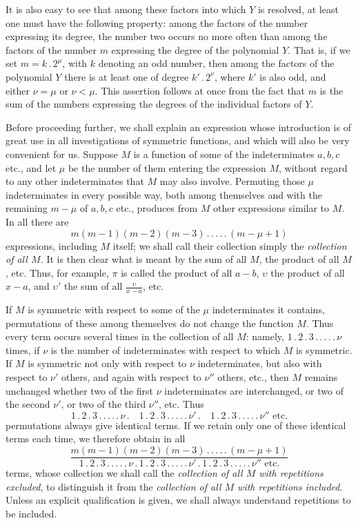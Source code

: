 It is also easy to see that among these factors into which $Y$ is resolved, at
least one must have the following property: among the factors of the number expressing its degree, the number two occurs no more often than among the factors of the number $m$ expressing the degree of the polynomial $Y$. That is, if we set $m=k\, .\,2^\mu$, with $k$ denoting an odd number, then among the factors of the polynomial $Y$ there is at least one of degree $k'\, .\,2^\nu$, where $k'$ is also odd, and either $\nu=\mu$ or $\nu<\mu$. This assertion follows at once from the fact that $m$ is the sum of the numbers expressing the degrees of the individual factors of $Y$.

Before proceeding further, we shall explain an expression whose introduction is of great use in all investigations of symmetric functions, and which will also be very convenient for us. Suppose $M$ is a function of some of the indeterminates $a,b,c$ etc., and let $\mu$ be the number of them entering the expression $M$, without regard to any other indeterminates that $M$ may also involve. Permuting those $\mu$ indeterminates in every possible way, both among themselves and with the remaining $m-\mu$ of $a,b,c$ etc., produces from $M$ other expressions similar to $M$. In all there are
\[
m(m-1)(m-2)(m-3)\, .\, .\, .\, .\, .\,(m-\mu+1)
\]
expressions, including $M$ itself; we shall call their collection simply the \textit{collection of all $M$.} It is then clear what is meant by the sum of all $M$, the product of all $M$, etc. Thus, for example, $\pi$ is called the product of all $a-b$, $\upsilon$ the product of all $x-a$, and $\upsilon'$ the sum of all $\frac{\upsilon}{x-a}$, etc.

If $M$ is symmetric with respect to some of the $\mu$ indeterminates it contains, permutations of these among themselves do not change the function $M$. Thus every term occurs several times in the collection of all $M$: namely, $1\, .\,2\, .\,3\, .\, .\, .\, .\, .\,\nu$ times, if $\nu$ is the number of indeterminates with respect to which $M$ is symmetric. If $M$ is symmetric not only with respect to $\nu$ indeterminates, but also with respect to $\nu'$ others, and again with respect to $\nu''$ others, etc., then $M$ remains unchanged whether two of the first $\nu$ indeterminates are interchanged, or two of the second $\nu'$, or two of the third $\nu''$, etc. Thus
\[
1\, .\,2\, .\,3\, .\, .\, .\, .\, .\,\nu\, .\quad1\, .\,2\, .\,3\, .\, .\, .\, .\, .\,\nu'\, .\quad1\, .\,2\, .\,3\, .\, .\, .\, .\, .\,\nu''\text{ etc.}
\]
permutations always give identical terms. If we retain only one of these identical terms each time, we therefore obtain in all
\[
\frac{m(m-1)(m-2)(m-3)\, .\, .\, .\, .\, .\,(m-\mu+1)}{1\, .\,2\, .\,3\, .\, .\, .\, .\, .\,\nu\, .\,1\, .\,2\, .\,3\, .\, .\, .\, .\, .\,\nu'\, .\,1\, .\,2\, .\,3\, .\, .\, .\, .\, .\,\nu''\text{ etc.}}
\]
terms, whose collection we shall call the \textit{collection of all $M$ with repetitions excluded}, to distinguish it from the \textit{collection of all $M$ with repetitions included}. Unless an explicit qualification is given, we shall always understand repetitions to be included.

